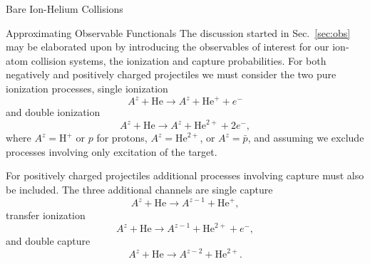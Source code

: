 \documentclass[letterpaper, 11 pt]{report}
\begin{document}
\begin{chapter}{Bare Ion-Helium Collisions \label{chap:p-he2p-he}}
\begin{section}{Approximating Observable Functionals \label{sec:phe2p-obs}}
      The discussion started in Sec.~\ref{sec:obs} may be elaborated upon by introducing the observables
      of interest for our ion-atom collision systems, the ionization and capture probabilities. For both
      negatively and positively charged projectiles we must consider the two pure ionization processes,
      single ionization
      \begin{equation} \label{eq:TI}
         A^z + \mathrm{He} \rightarrow A^z + \mathrm{He}^+ + e^-
      \end{equation}
      and double ionization
      \begin{equation} \label{eq:II}
         A^z + \mathrm{He} \rightarrow A^z + \mathrm{He}^{2+} + 2e^-,
      \end{equation}
      where $A^z = \mathrm{H}^+$ or $p$ for protons, $A^z = \mathrm{He}^{2+}$, or $A^z = \bar{p}$, and
      assuming we exclude processes involving only excitation of the target.

      For positively charged projectiles additional processes involving capture must also be included.
      The three additional channels are single capture
      \begin{equation} \label{eq:TP}
         A^z + \mathrm{He} \rightarrow A^{z-1} + \mathrm{He}^{+},
      \end{equation}
      transfer ionization
      \begin{equation} \label{eq:IP}
         A^z + \mathrm{He} \rightarrow A^{z-1} + \mathrm{He}^{2+} + e^-,
      \end{equation}
      and double capture
      \begin{equation} \label{eq:PP}
         A^z + \mathrm{He} \rightarrow A^{z-2} + \mathrm{He}^{2+}.
      \end{equation}


\end{section}
\end{chapter}
\end{document}
